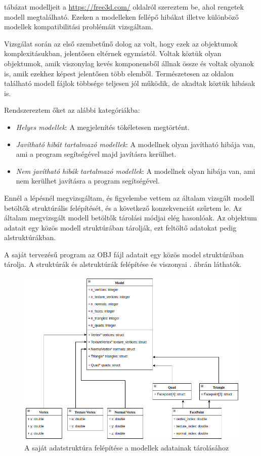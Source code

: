  tábázat modelljeit a \url{https://free3d.com/} oldalról szereztem be, ahol rengetek modell megtalálható. Ezeken a modelleken fellépő hibákat illetve különböző modellek kompatibilitási problémáit vizsgáltam.

Vizsgálat során az első szembetűnő dolog az volt, hogy ezek az objektumok komplexitásukban, jelentősen eltérnek egymástól. Voltak köztük olyan objektumok, amik viszonylag kevés komponensből állnak össze és voltak olyanok is, amik ezekhez képest jelentősen több elemből.
Természetesen az oldalon található modell fájlok többsége teljesen jól működik, de akadtak köztük hibásak is.

Rendszereztem őket az alábbi kategóriákba:
\begin{itemize}
\item \textit{Helyes modellek}:
A megjelenítés tökéletesen megtörtént.
\item \textit{Javítható hibát tartalmazó modellek}:
A modellnek olyan javítható hibája van, ami a program segítségével majd javításra kerülhet.
\item \textit{Nem javítható hibák tartalmazó modellek}:
A modellnek olyan hibája van, ami nem kerülhet javításra a program segítségével.
\end{itemize}
\bigskip


Ennél a lépésnél megvizsgáltam, és figyelembe vettem az általam vizsgált modell betöltők struktúrális felépítését, és a következő konzekvenciát szűrtem le.
Az általam megvizsgált modell betöltők tárolási módjai elég hasonlóak. Az objektum adatait egy közös modell struktúrában tárolják, ezt feltöltő adatokat pedig alstruktúrákban.

A saját tervezésű program az OBJ fájl adatait egy közös model struktúrában tárolja. A struktúrák és alstruktúrák felépítése és viszonyai . ábrán láthatók.

\begin{figure}[h]
\centering
\includegraphics[width=\textwidth]{images/struct.png}
\caption{A saját adatstruktúra felépítése a modellek adatainak tárolásához}
\label{fig:struct}
\end{figure}

